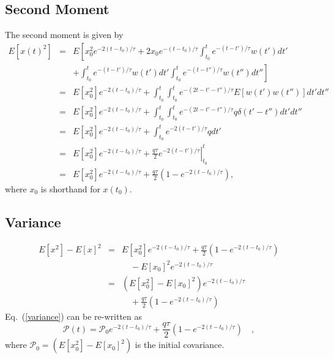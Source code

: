\documentclass[10pt]{article}
\begin{document}
\subsection{Second Moment}

The second moment is given by 
\begin{eqnarray}\label{second_moment}
   E[ x(t)^2 ] & = & E \left[ x_{0}^2 e^{ -2(t-t_{0})/\tau } + 2 x_{0} e^{ -(t-t_{0})/\tau } \int_{t_{0}}^{t} e^{ -(t-t')/\tau } w(t') dt' \right. \nonumber \\
               &   & \left. + \int_{t_{0}}^{t} e^{ -(t-t')/\tau } w(t') dt' \int_{t_{0}}^{t} e^{ -(t-t'')/\tau } w(t'') dt'' \right] \nonumber \\
		       & = & E \left[x_{0}^2\right]e^{ -2(t-t_{0})/\tau } +  \int_{t_{0}}^{t} \int_{t_{0}}^{t} e^{ -(2t-t'-t'')/\tau } 
			         E \left[ w(t') w(t'') \right] dt' dt'' \nonumber \\
			   & = & E \left[x_{0}^2\right]e^{ -2(t-t_{0})/\tau } +  \int_{t_{0}}^{t} \int_{t_{0}}^{t} e^{ -(2t-t'-t'')/\tau } 
			         q \delta(t'-t'') dt' dt'' \nonumber \\
		       & = & E \left[x_{0}^2\right]e^{ -2(t-t_{0})/\tau } +  \int_{t_{0}}^{t} e^{ -2(t-t')/\tau } q dt' \nonumber \\
			   & = & E \left[x_{0}^2\right]e^{ -2(t-t_{0})/\tau } +  \left. \frac{q \tau}{2} e^{ -2(t-t')/\tau } \right|^t_{t_{0}} \nonumber \\
			   & = & E \left[x_{0}^2\right]e^{ -2(t-t_{0})/\tau } +  \frac{q \tau}{2} \left( 1 - e^{ -2(t-t_{0})/\tau } \right) ,
\end{eqnarray}
where $x_0$ is shorthand for $x(t_0)$.

\subsection{Variance}
\begin{eqnarray}\label{variance}
  E \left[x^2\right] - E\left[x\right]^2 & = & E\left[x_{0}^2\right] e^{-2(t-t_{0})/\tau} + \frac{q\tau}{2} \left(1- e^{-2(t-t_{0})/\tau} \right) \nonumber \\
                                         &   & \quad - E\left[x_{0}\right]^2 e^{-2(t-t_{0})/\tau} \nonumber \\
								         & = & \left( E\left[x_{0}^2\right] - E \left[x_{0}\right]^2 \right) e^{-2(t-t_{0})/\tau} \nonumber \\
                                         &   & \quad + \frac{q\tau}{2} \left(1- e^{-2(t-t_{0})/\tau} \right)
\end{eqnarray}
Eq.\ (\ref{variance}) can be re-written as
\begin{equation}\label{variance_2}
  {\mathcal P}(t) = {\mathcal P}_0 e^{ -2(t-t_0)/\tau } + \frac{q\tau}{2}\left(1-e^{-2(t-t_{0})/\tau}\right) \quad ,
\end{equation}
where ${\mathcal P_0} = \left( E\left[x_0^2\right] - E\left[x_0\right]^2 \right)$ is the initial covariance.
\end{document}
